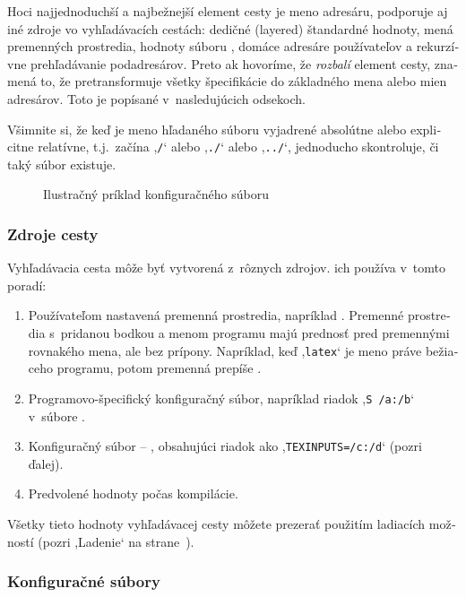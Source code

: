 \documentclass[\classoptions,slovak,english,czech]{\classname}
\newcommand{\singleuv}[1]{,#1`}
\begin{document}
\begin{otherlanguage}{slovak}
Hoci najjednoduchší a najbežnejší element cesty je meno adresáru,
\KPS{} podporuje aj iné zdroje vo vyhľadávacích cestách: dedičné
(layered) štandardné hodnoty, mená premenných prostredia, hodnoty
súboru , domáce adresáre používateľov a rekurzívne
prehľadávanie podadresárov. Preto ak hovoríme, že \KPS{}
\emph{rozbalí} element cesty, znamená to, že pretransformuje všetky
špecifikácie do základného mena alebo mien adresárov. Toto je
popísané v~nasledujúcich odsekoch.

Všimnite si, že keď je meno hľadaného súboru vyjadrené absolútne
alebo explicitne relatívne, t.j.\ začína \singleuv{\texttt{/}} alebo \singleuv{\texttt{./}}
alebo \singleuv{\texttt{../}}, \KPS{} jednoducho skontroluje, či taký súbor
existuje.
\ifSingleColumn
\else
\begin{figure*}

\setlength{\abovecaptionskip}{0pt}
  \caption{Ilustračný príklad konfiguračného súboru}
  \label{fig:configsample}
\end{figure*}
\fi

\subsubsection{Zdroje cesty}
\label{sec:pathsources}
Vyhľadávacia cesta môže byť vytvorená z~rôznych zdrojov.
\KPS{} ich používa v~tomto poradí:
\begin{enumerate}
\item
  Používateľom nastavená premenná prostredia, napríklad \@.
  Premenné prostredia s~pridanou bodkou a menom programu majú prednosť pred
premennými rovnakého mena, ale bez prípony.
  Napríklad, keď \singleuv{\texttt{latex}} je meno práve bežiaceho programu, potom
  premenná  prepíše .
\item
  Programovo-špecifický konfiguračný súbor, napríklad riadok
  \singleuv{\texttt{S /a:/b}} v~súbore  .
\item Konfiguračný súbor \KPS{} -- , obsahujúci riadok
  ako \singleuv{\texttt{TEXINPUTS=/c:/d}} (pozri ďalej).
\item Predvolené hodnoty počas kompilácie.
\end{enumerate}
\noindent Všetky tieto hodnoty vyhľadávacej cesty môžete prezerať
použitím ladiacích možností (pozri \singleuv{Ladenie} na
strane~\pageref{sec:debugging}).

\subsubsection{Konfiguračné súbory}


\end{otherlanguage}
\end{document}

